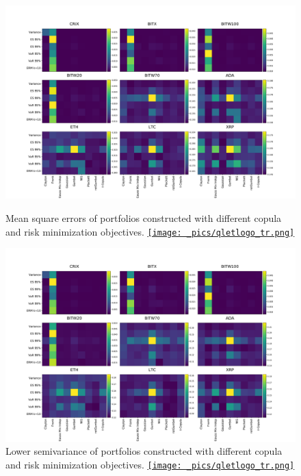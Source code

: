 \newpage
\begin{figure}[!]
        \centering
        \includegraphics[width=\textwidth]{_pics/MSE_other.pdf}
      \caption{Mean square errors of portfolios constructed with different copula and risk minimization objectives.
      \href{http://www.quantlet.com/}{\texttt{[image: \_pics/qletlogo\_tr.png]}} }
    \label{fig:MSE_other}

        \centering
        \includegraphics[width=\textwidth]{_pics/semiLowerVariance_other.pdf}
      \caption{Lower semivariance of portfolios constructed with different copula and risk minimization objectives.
      \href{http://www.quantlet.com/}{\texttt{[image: \_pics/qletlogo\_tr.png]}}
  }
    \label{fig:SLV_other}
\end{figure}
\clearpage

